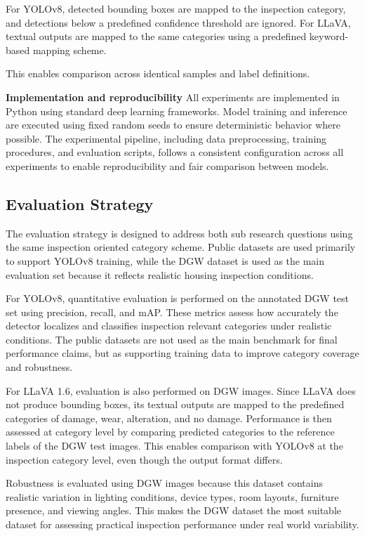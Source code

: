 For YOLOv8, detected bounding boxes are mapped to the inspection category, and detections below a predefined confidence threshold are ignored. For LLaVA, textual outputs are mapped to the same categories using a predefined keyword-based mapping scheme. 

This enables comparison across identical samples and label definitions.

\textbf{Implementation and reproducibility}
All experiments are implemented in Python using standard deep learning frameworks. Model training and inference are executed using fixed random seeds to ensure deterministic behavior where possible. The experimental pipeline, including data preprocessing, training procedures, and evaluation scripts, follows a consistent configuration across all experiments to enable reproducibility and fair comparison between models.

\subsection{Evaluation Strategy}

The evaluation strategy is designed to address both sub research questions using the same inspection oriented category scheme. Public datasets are used primarily to support YOLOv8 training, while the DGW dataset is used as the main evaluation set because it reflects realistic housing inspection conditions.

For YOLOv8, quantitative evaluation is performed on the annotated DGW test set using precision, recall, and mAP. These metrics assess how accurately the detector localizes and classifies inspection relevant categories under realistic conditions. The public datasets are not used as the main benchmark for final performance claims, but as supporting training data to improve category coverage and robustness.

For LLaVA 1.6, evaluation is also performed on DGW images. Since LLaVA does not produce bounding boxes, its textual outputs are mapped to the predefined categories of damage, wear, alteration, and no damage. Performance is then assessed at category level by comparing predicted categories to the reference labels of the DGW test images. This enables comparison with YOLOv8 at the inspection category level, even though the output format differs.

Robustness is evaluated using DGW images because this dataset contains realistic variation in lighting conditions, device types, room layouts, furniture presence, and viewing angles. This makes the DGW dataset the most suitable dataset for assessing practical inspection performance under real world variability.

